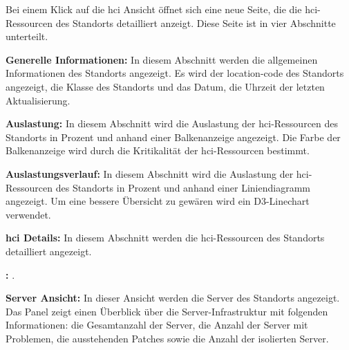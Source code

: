 \begin{compactitem}
\begin{compactitem}
\begin{compactitem}
            Bei einem Klick auf die \gls{hci} Ansicht öffnet sich eine neue Seite, die die \gls{hci}-Ressourcen des Standorts detailliert anzeigt.
            Diese Seite ist in vier Abschnitte unterteilt.

            \begin{compactitem}
                \item \textbf{Generelle Informationen:} In diesem Abschnitt werden die allgemeinen Informationen des Standorts angezeigt.
                Es wird der \gls{location-code} des Standorts angezeigt, 
                die Klasse des Standorts und das Datum, die Uhrzeit der letzten Aktualisierung.

                \item \textbf{Auslastung:} In diesem Abschnitt wird die Auslastung der \gls{hci}-Ressourcen des Standorts
                in Prozent und anhand einer Balkenanzeige angezeigt. 
                Die Farbe der Balkenanzeige wird durch die Kritikalität der \gls{hci}-Ressourcen bestimmt.

                \item \textbf{Auslastungsverlauf:} In diesem Abschnitt wird die Auslastung der \gls{hci}-Ressourcen des Standorts
                in Prozent und anhand einer Liniendiagramm angezeigt. Um eine bessere Übersicht zu gewären wird ein D3-Linechart verwendet.

                \item \textbf{\gls{hci} Details:} In diesem Abschnitt werden die \gls{hci}-Ressourcen des Standorts detailliert angezeigt.
                
                \begin{compactitem}
                    \item \textbf{:} .
                \end{compactitem}

            \end{compactitem}

            \item \textbf{Server Ansicht:} In dieser Ansicht werden die Server des Standorts angezeigt.
            Das Panel zeigt einen Überblick über die Server-Infrastruktur mit folgenden Informationen:
            die Gesamtanzahl der Server, die Anzahl der Server mit Problemen, die ausstehenden Patches sowie die Anzahl der isolierten Server.
            

\end{compactitem}
\end{compactitem}
\end{compactitem}
